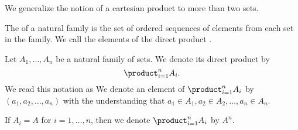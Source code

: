 
\sbasic














\sstart
{}


We generalize the notion
of a cartesian product to
more than two sets.


The 
of a natural family is
the set of ordered sequences
of elements from each set in the family.
We call the elements of the direct product
.


Let $A_1, \dots, A_n$ be a natural family
of sets. We denote its direct product by
\[
  \product_{i = 1}^{n} A_{i}.
\]
We read this notation as 
We denote an element of $\product_{i = 1}^{n} A_{i}$ by $(a_1, a_2, \dots, a_n)$ with the understanding that $a_1 \in A_1, a_2 \in A_2, \dots, a_n \in A_n$.

If $A_i = A$ for $i = 1, \dots, n$, then we denote
$\product_{i = 1}^{n} A_{i}$ by $A^n$.


\strats
\strats

